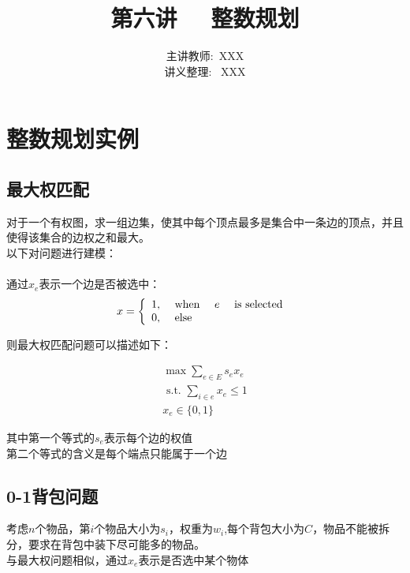 \documentclass[11pt]{ctexart}
\title{\Huge 第六讲  \ \ 整数规划}
\author{主讲教师:\  XXX
\\ 讲义整理: \ XXX}
\begin{document}
\maketitle



\section{整数规划实例}

\subsection{最大权匹配}
对于一个有权图，求一组边集，使其中每个顶点最多是集合中一条边的顶点，并且使得该集合的边权之和最大。\\

以下对问题进行建模：\\
\\
通过$x_e$表示一个边是否被选中：\\

$$
x=\left\{\begin{array}{ll}
1, & \text { when \quad } e \text { \quad is selected } \\
0, & \text { else } 
\end{array}\right.
$$

则最大权匹配问题可以描述如下：

$$
\begin{array}{c}
\max \sum_{e \in E} s_{e}x_{e} \\
\text { s.t. } \sum_{i \in e} x_{e} \leq 1 \\
x_{e} \in\{0,1\}
\end{array}
$$

其中第一个等式的$s_{e}$表示每个边的权值 \\

第二个等式的含义是每个端点只能属于一个边 \\


\subsection{0-1背包问题}

考虑$n$个物品，第$i$个物品大小为$s_i$，权重为$w_i$,每个背包大小为$C$，物品不能被拆分，要求在背包中装下尽可能多的物品。\\

与最大权问题相似，通过$x_e$表示是否选中某个物体\\
\end{document}
